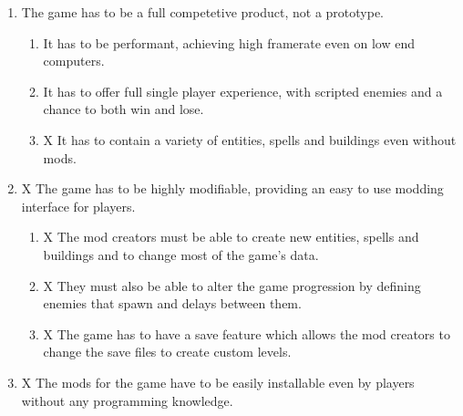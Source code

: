 \begin{enumerate}[label=\textbf{(G\arabic*)}]
    \item The game has to be a full competetive product, not a prototype.
        \begin{enumerate}[label=\textbf{(G1.\arabic*)}]
            \item It has to be performant, achieving high framerate even on low end computers.
            \item It has to offer full single player experience, with scripted enemies and a chance to both win and lose.
            \item X It has to contain a variety of entities, spells and buildings even without mods.
        \end{enumerate}
    \item X The game has to be highly modifiable, providing an easy to use modding interface for players.
        \begin{enumerate}[label=\textbf{(G2.\arabic*)}]
            \item X The mod creators must be able to create new entities, spells and buildings and to change most of the game's data.
            \item X They must also be able to alter the game progression by defining enemies that spawn and delays between them.
            \item X The game has to have a save feature which allows the mod creators to change the save files to create custom levels.
        \end{enumerate}
    \item X The mods for the game have to be easily installable even by players without any programming knowledge. 
\end{enumerate}
